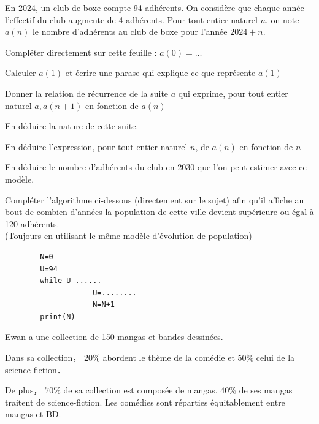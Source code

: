 \documentclass[11pt,a4paper]{article}  %
\begin{document}
En 2024, un club de boxe compte 94 adhérents. On considère que chaque année l'effectif du club augmente de 4 adhérents. Pour tout entier naturel $n$, on note $a(n)$ le nombre d'adhérents au club de boxe pour l'année $2024+n$.
\begin{enumMet}
	\item Compléter directement sur cette feuille : $a(0)=\ldots$
	\item Calculer $a(1)$ et écrire une phrase qui explique ce que représente $a(1)$
	\item \begin{enumMet}
		\item Donner la relation de récurrence de la suite $a$ qui exprime, pour tout entier naturel $a, a(n+1)$ en fonction de $a(n)$\\
		\item En déduire la nature de cette suite.
	\end{enumMet}
	\item En déduire l'expression, pour tout entier naturel $n$, de $a(n)$ en fonction de $n$
	\item En déduire le nombre d'adhérents du club en 2030 que l'on peut estimer avec ce modèle.
	\item Compléter l'algorithme ci-dessous (directement sur le sujet) afin qu'il affiche au bout de combien d'années la population de cette ville devient supérieure ou égal à 120 adhérents.\\
	(Toujours en utilisant le même modèle d'évolution de population)
	\begin{verbatim}
		N=0
		U=94
		while U ......
					U=........
					N=N+1
		print(N)
	\end{verbatim}
\end{enumMet}

\exerciceDS{}

Ewan a une collection de 150 mangas et bandes dessinées.

Dans sa collection， $20 \%$ abordent le thème de la comédie et $50 \%$ celui de la science-fiction．

De plus， $70 \%$ de sa collection est composée de mangas. $40 \%$ de ses mangas traitent de science-fiction. Les comédies sont réparties équitablement entre mangas et BD.
\end{document}
